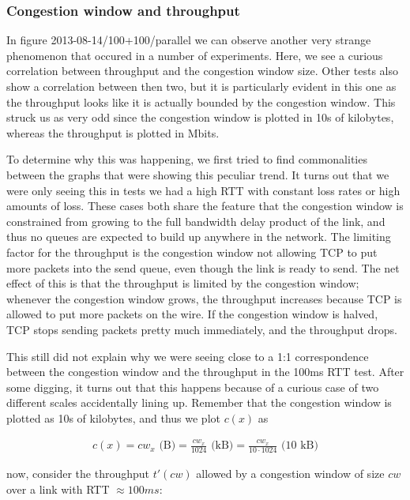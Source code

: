 \documentclass[12pt,a4paper]{article}
\begin{document}
\subsubsection{Congestion window and throughput}
In figure 2013-08-14/100+100/parallel we can observe another very strange      %
phenomenon that occured in a number of experiments. Here, we see a curious
correlation between throughput and the congestion window size. Other tests also
show a correlation between then two, but it is particularly evident in this one
as the throughput looks like it is actually bounded by the congestion window.
This struck us as very odd since the congestion window is plotted in 10s of
kilobytes, whereas the throughput is plotted in Mbits.

To determine why this was happening, we first tried to find commonalities
between the graphs that were showing this peculiar trend. It turns out that we
were only seeing this in tests we had a high RTT with constant loss rates or
high amounts of loss. These cases both share the feature that the congestion
window is constrained from growing to the full bandwidth delay product of the
link, and thus no queues are expected to build up anywhere in the network. The
limiting factor for the throughput is the congestion window not allowing TCP to
put more packets into the send queue, even though the link is ready to send. The
net effect of this is that the throughput is limited by the congestion window;
whenever the congestion window grows, the throughput increases because TCP is
allowed to put more packets on the wire. If the congestion window is halved, TCP
stops sending packets pretty much immediately, and the throughput drops.

This still did not explain why we were seeing close to a 1:1 correspondence
between the congestion window and the throughput in the 100ms RTT test. After
some digging, it turns out that this happens because of a curious case of two
different scales accidentally lining up. Remember that the congestion window is
plotted as 10s of kilobytes, and thus we plot $c(x)$ as

\begin{align*}
  c(x) = cw_x \text{\ (B)}
       = \frac{cw_x}{1024} \text{\ (kB)}
       = \frac{cw_x}{10 \cdot 1024} \text{\ (10 kB)}
\end{align*}

now, consider the throughput $t'(cw)$ allowed by a congestion window of size
$cw$ over a link with RTT $\approx 100ms$:
\end{document}
